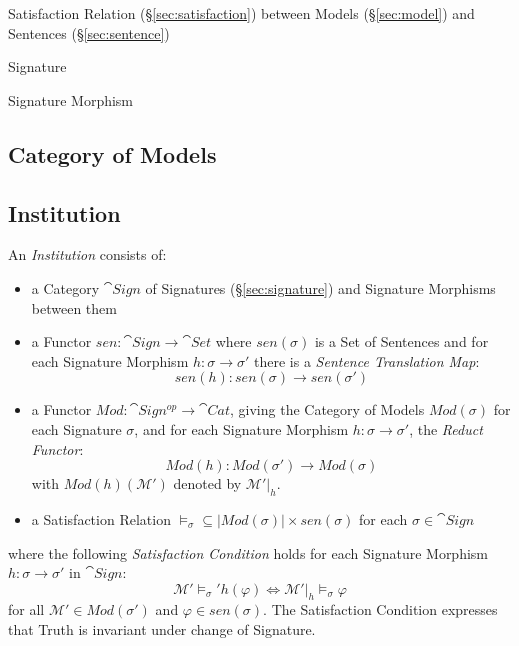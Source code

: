 Satisfaction Relation (\S\ref{sec:satisfaction}) between Models
(\S\ref{sec:model}) and Sentences (\S\ref{sec:sentence})

Signature

Signature Morphism



\subsection{Category of Models}\label{sec:category_of_models}

\subsection{Institution}\label{sec:institution}

An \emph{Institution} consists of:

\begin{itemize}
\item a Category $\cat{Sign}$ of Signatures (\S\ref{sec:signature})
  and Signature Morphisms between them
\item a Functor $sen : \cat{Sign} \rightarrow \cat{Set}$ where
  $sen(\sigma)$ is a Set of Sentences and for each Signature Morphism
  $h : \sigma \rightarrow \sigma'$ there is a \emph{Sentence
  Translation Map}:
  \[
  sen(h) : sen(\sigma) \rightarrow sen(\sigma')
  \]
\item a Functor $Mod : \cat{Sign^{op}} \rightarrow \cat{Cat}$,
  giving the Category of Models $Mod (\sigma)$ for each Signature
  $\sigma$, and for each Signature Morphism $h : \sigma \rightarrow
  \sigma'$, the \emph{Reduct Functor}:
  \[
  Mod(h) : Mod(\sigma') \rightarrow Mod(\sigma)
  \]
  with $Mod(h)(\mathcal{M}')$ denoted by $\mathcal{M}'|_h$.
\item a Satisfaction Relation $\models_\sigma \subseteq |Mod(\sigma)|
  \times sen(\sigma)$ for each $\sigma \in \cat{Sign}$
\end{itemize}
where the following \emph{Satisfaction Condition} holds for each
Signature Morphism $h : \sigma \rightarrow \sigma'$ in
$\cat{Sign}$:
\[
  \mathcal{M}' \models_\sigma' h(\varphi) \Leftrightarrow
  \mathcal{M}'|_h \models_\sigma \varphi
\]
for all $\mathcal{M}' \in Mod(\sigma')$ and $\varphi \in sen(\sigma)$.
The Satisfaction Condition expresses that Truth is invariant under
change of Signature.



